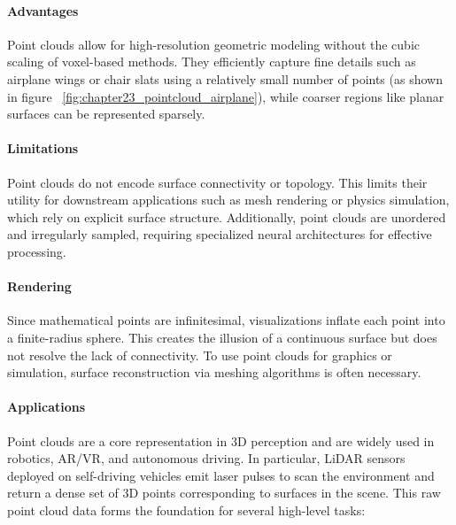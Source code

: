 \paragraph{Advantages} 
Point clouds allow for high-resolution geometric modeling without the cubic scaling of voxel-based methods. They efficiently capture fine details such as airplane wings or chair slats using a relatively small number of points (as shown in figure ~\ref{fig:chapter23_pointcloud_airplane}), while coarser regions like planar surfaces can be represented sparsely.

\paragraph{Limitations} 
Point clouds do not encode surface connectivity or topology. This limits their utility for downstream applications such as mesh rendering or physics simulation, which rely on explicit surface structure. Additionally, point clouds are unordered and irregularly sampled, requiring specialized neural architectures for effective processing.

\paragraph{Rendering} 
Since mathematical points are infinitesimal, visualizations inflate each point into a finite-radius sphere. This creates the illusion of a continuous surface but does not resolve the lack of connectivity. To use point clouds for graphics or simulation, surface reconstruction via meshing algorithms is often necessary.

\paragraph{Applications}
Point clouds are a core representation in 3D perception and are widely used in robotics, AR/VR, and autonomous driving. In particular, LiDAR sensors deployed on self-driving vehicles emit laser pulses to scan the environment and return a dense set of 3D points corresponding to surfaces in the scene. This raw point cloud data forms the foundation for several high-level tasks:


